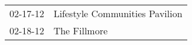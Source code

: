 \begin{supertabular}{p{0.25\columnwidth}p{0.75\columnwidth}}
 02-17-12 &  Lifestyle Communities Pavilion \\
 02-18-12 &                    The Fillmore \\
\end{supertabular}
